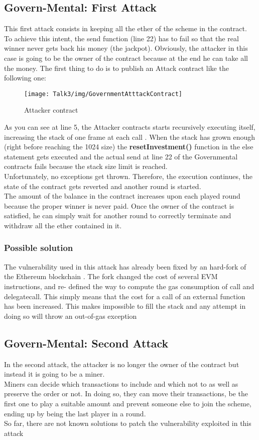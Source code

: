 \subsection{Govern-Mental: First Attack}
This first attack consists in keeping all the ether of the scheme in the contract. To achieve this intent, the send function (line 22) has to fail so that the real winner never gets back his money (the jackpot).
Obviously, the attacker in this case is going to be the owner of the contract because at the end he can take all the money.
The first thing to do is to publish an Attack contract like the following one:
\begin{figure}[H]
\begin{center}
\texttt{[image: Talk3/img/GovernmentAtttackContract]}
\end{center}
\caption{Attacker contract}
\label{label}
\end{figure}
As you can see at line 5, the Attacker contracts starts recursively executing itself, increasing the stack of one frame at each call \cite{paper2}.
When the stack has grown enough (right before reaching the 1024 size) the \textbf{resetInvestment()} function in the else statement gets executed and the actual send at line 22 of the Governmental contracts fails because the stack size limit is reached.\\
Unfortunately, no exceptions get thrown. Therefore, the execution continues, the state of the contract gets reverted and another round is started.\\
The amount of the balance in the contract increases upon each played round because the proper winner is never paid. Once the owner of the contract is satisfied, he can simply wait for another round to correctly terminate and withdraw all the ether contained in it.
\subsubsection{Possible solution}
The vulnerability used in this attack has already been fixed by an hard-fork of the Ethereum blockchain \cite{hardfork}. The fork changed the cost of several EVM instructions, and re- defined the way to compute the gas consumption of call and delegatecall\cite{paper2}.
This simply means that the cost for a call of an external function has been increased. This makes impossible to fill the stack and any attempt in doing so will throw an out-of-gas exception
\subsection{Govern-Mental: Second Attack}
In the second attack, the attacker is no longer the owner of the contract but instead it is going to be a miner.\\
Miners can decide which transactions to include and which not to as well as preserve the order or not\cite{paper2}. In doing so, they can move their transactions, be the first one to play a suitable amount and prevent someone else to join the scheme, ending up by being the last player in a round.\\
So far, there are not known solutions to patch the vulnerability exploited in this attack


